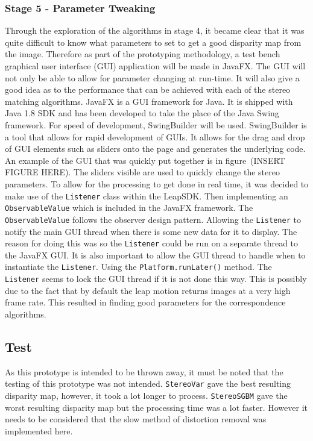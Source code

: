 \documentclass[11pt,oneside]{report}
\newcommand\code[1]{\texttt{#1}}
\begin{document}
		\subsubsection{Stage 5 - Parameter Tweaking}
		Through the exploration of the algorithms in stage 4, it became clear that it was quite difficult to know what parameters to set to get a good disparity map from the image.
		Therefore as part of the prototyping methodology, a test bench graphical user interface (GUI) application will be made in JavaFX.
		The GUI will not only be able to allow for parameter changing at run-time.
		It will also give a good idea as to the performance that can be achieved with each of the stereo matching algorithms.
		JavaFX is a GUI framework for Java.
		It is shipped with Java 1.8 SDK and has been developed to take the place of the Java Swing framework.
		For speed of development, SwingBuilder will be used.
		SwingBuilder is a tool that allows for rapid development of GUIs.
		It allows for the drag and drop of GUI elements such as sliders onto the page and generates the underlying code.
		An example of the GUI that was quickly put together is in figure~(INSERT FIGURE HERE).
		The sliders visible are used to quickly change the stereo parameters.
		To allow for the processing to get done in real time, it was decided to make use of the \code{Listener} class within the LeapSDK.
		Then implementing an \code{ObservableValue} which is included in the JavaFX framework.
		The \code{ObservableValue} follows the observer design pattern.
		Allowing the \code{Listener} to notify the main GUI thread when there is some new data for it to display.
		The reason for doing this was so the \code{Listener} could be run on a separate thread to the JavaFX GUI.
		It is also important to allow the GUI thread to handle when to instantiate the \code{Listener}.
		Using the \code{Platform.runLater()} method.
		The \code{Listener} seems to lock the GUI thread if it is not done this way.
		This is possibly due to the fact that by default the leap motion returns images at a very high frame rate.
		This resulted in finding good parameters for the correspondence algorithms.
		\subsection{Test}
		As this prototype is intended to be thrown away, it must be noted that the testing of this prototype was not intended.
		\code{StereoVar} gave the best resulting disparity map, however, it took a lot longer to process.
		\code{StereoSGBM} gave the worst resulting disparity map but the processing time was a lot faster.
		However it needs to be considered that the slow method of distortion removal was implemented here.
\end{document}
